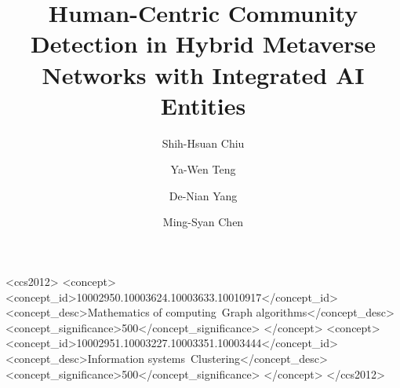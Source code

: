 \documentclass[sigconf]{acmart}
\begin{document}
\title{Human-Centric Community Detection in Hybrid Metaverse Networks with Integrated AI Entities}

\author{Shih-Hsuan Chiu}

\author{Ya-Wen Teng}

\author{De-Nian Yang}

\author{Ming-Syan Chen}




\begin{CCSXML}
<ccs2012>
   <concept>
       <concept_id>10002950.10003624.10003633.10010917</concept_id>
       <concept_desc>Mathematics of computing~Graph algorithms</concept_desc>
       <concept_significance>500</concept_significance>
       </concept>
   <concept>
       <concept_id>10002951.10003227.10003351.10003444</concept_id>
       <concept_desc>Information systems~Clustering</concept_desc>
       <concept_significance>500</concept_significance>
       </concept>
 </ccs2012>
\end{CCSXML}




\maketitle













\clearpage



\end{document}
